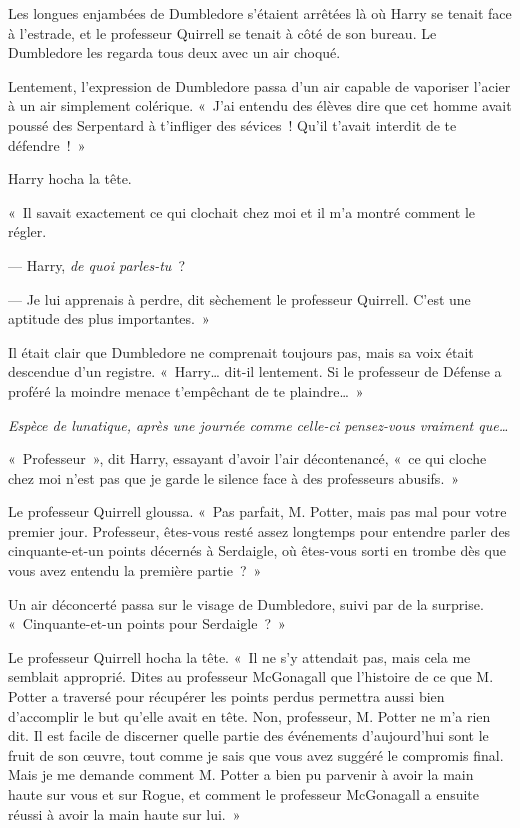 Les longues enjambées de Dumbledore s'étaient arrêtées là où Harry se tenait face à l'estrade, et le professeur Quirrell se tenait à côté de son bureau.
Le Dumbledore les regarda tous deux avec un air choqué.

Lentement, l'expression de Dumbledore passa d'un air capable de vaporiser l'acier à un air simplement colérique.
«~J'ai entendu des élèves dire que cet homme avait poussé des Serpentard à t'infliger des sévices~!
Qu'il t'avait interdit de te défendre~!~»

Harry hocha la tête.

«~Il savait exactement ce qui clochait chez moi et il m'a montré comment le régler.

--- Harry, \emph{de quoi parles-tu}~?

--- Je lui apprenais à perdre, dit sèchement le professeur Quirrell.
C'est une aptitude des plus importantes.~»

Il était clair que Dumbledore ne comprenait toujours pas, mais sa voix était descendue d'un registre.
«~Harry… dit-il lentement.
Si le professeur de Défense a proféré la moindre menace t'empêchant de te plaindre…~»

\emph{Espèce de lunatique, après une journée comme celle-ci pensez-vous vraiment que…}

«~Professeur~», dit Harry, essayant d'avoir l'air décontenancé, «~ce qui cloche chez moi n'est pas que je garde le silence face à des professeurs abusifs.~»

Le professeur Quirrell gloussa.
«~Pas parfait, M. Potter, mais pas mal pour votre premier jour.
Professeur, êtes-vous resté assez longtemps pour entendre parler des cinquante-et-un points décernés à Serdaigle, où êtes-vous sorti en trombe dès que vous avez entendu la première partie~?~»

Un air déconcerté passa sur le visage de Dumbledore, suivi par de la surprise.
«~Cinquante-et-un points pour Serdaigle~?~»

Le professeur Quirrell hocha la tête.
«~Il ne s'y attendait pas, mais cela me semblait approprié.
Dites au professeur McGonagall que l'histoire de ce que M. Potter a traversé pour récupérer les points perdus permettra aussi bien d'accomplir le but qu'elle avait en tête.
Non, professeur, M. Potter ne m'a rien dit.
Il est facile de discerner quelle partie des événements d'aujourd'hui sont le fruit de son œuvre, tout comme je sais que vous avez suggéré le compromis final.
Mais je me demande comment M. Potter a bien pu parvenir à avoir la main haute sur vous et sur Rogue, et comment le professeur McGonagall a ensuite réussi à avoir la main haute sur lui.~»

